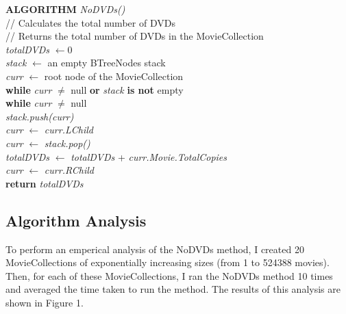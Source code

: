 \documentclass[12pt,a4paper]{article}
\begin{document}
			\textbf{ALGORITHM} \textit{NoDVDs()}\\
			\null\hspace{1cm}// Calculates the total number of DVDs\\
			\null\hspace{1cm}// Returns the total number of DVDs in the MovieCollection\\
			\null\hspace{1cm}\textit{totalDVDs} $\leftarrow 0$\\
			\null\hspace{1cm}\textit{stack} $\leftarrow$ an empty BTreeNodes stack\\
			\null\hspace{1cm}\textit{curr} $\leftarrow$ root node of the MovieCollection\\
			\null\hspace{1cm}\textbf{while} \textit{curr} $\neq$ null \textbf{or} 
			\textit{stack} \textbf{is not} empty\\
			\null\hspace{2cm}\textbf{while} \textit{curr} $\neq$ null\\
			\null\hspace{3cm}\textit{stack.push(curr)}\\
			\null\hspace{3cm}\textit{curr} $\leftarrow$ \textit{curr.LChild}\\
			\null\hspace{2cm}\textit{curr} $\leftarrow$ \textit{stack.pop()}\\
			\null\hspace{2cm}\textit{totalDVDs} $\leftarrow$ \textit{totalDVDs} + 
			\textit{curr.Movie.TotalCopies}\\
			\null\hspace{2cm}\textit{curr} $\leftarrow$ \textit{curr.RChild}\\
			\null\hspace{1cm}\textbf{return} \textit{totalDVDs}

		\newpage

		\subsection{Algorithm Analysis}
			To perform an emperical analysis of the NoDVDs method, I created 20 
			MovieCollections of exponentially increasing sizes (from 1 to 524388 
			movies). Then, for each of these MovieCollections, I ran the NoDVDs 
			method 10 times and averaged the time taken to run the method. The 
			results of this analysis are shown in Figure 1.\\
\end{document}

